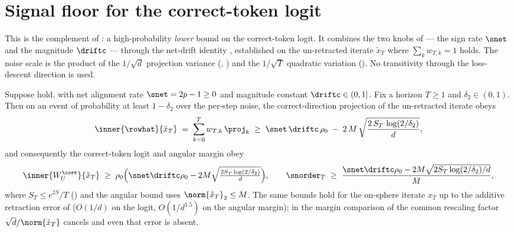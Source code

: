 \section{Signal floor for the correct-token logit}
\label{sec:signal_floor}

This is the complement of : a high-probability
\emph{lower} bound on the correct-token logit. It combines the two knobs of
 --- the sign rate $\snet$ and the magnitude $\driftc$ ---
through the net-drift identity , established on the
un-retracted iterate $\tilde x_T$ where $\sum_k w_{T,k}=1$ holds. The noise
scale is the product of the $1/\sqrt d$ projection variance
(, ) and the $1/\sqrt T$
quadratic variation (). No transitivity through the
loss-descent direction is used.

\begin{lemma}
\label{lem:signal_floor}
Suppose  hold, with net
alignment rate $\snet=2p-1\ge0$ and magnitude constant $\driftc\in(0,1]$.
Fix a horizon $T\ge1$ and $\delta_2\in(0,1)$. Then on an event of
probability at least $1-\delta_2$ over the per-step noise, the
correct-direction projection of the un-retracted iterate obeys
\begin{align}\label{eq:signal_floor_unit}
   \inner{\rowhat}{\tilde x_T}
   \;=\; \sum_{k=0}^{T} w_{T,k}\,\proj_k
   \;\ge\;
   \snet\,\driftc\,\rho_0
   \;-\;
   2\,M\,\sqrt{\frac{2\,S_T\,\log(2/\delta_2)}{d}},
\end{align}
and consequently the correct-token logit and angular margin obey
\begin{align}\label{eq:signal_floor_logit}
   \inner{W_U^{\corr}}{\tilde x_T} \;\ge\; \rho_0\Bigl(\snet\driftc\rho_0
      - 2M\sqrt{\tfrac{2S_T\log(2/\delta_2)}{d}}\Bigr),
   \qquad
   \snorder_T \;\ge\; \frac{\snet\driftc\rho_0 - 2M\sqrt{2S_T\log(2/\delta_2)/d}}{M},
\end{align}
where $S_T\le e^{2S}/T$ () and the angular bound
uses $\norm{\tilde x_T}_2\le M$. The same bounds hold for the on-sphere
iterate $x_T$ up to the additive retraction error of
 ($O(1/d)$ on the logit, $O(1/d^{1.5})$ on
the angular margin); in the margin comparison of  the common
rescaling factor $\sqrt d/\norm{\tilde x_T}$ cancels and even that error is
absent.
\end{lemma}

